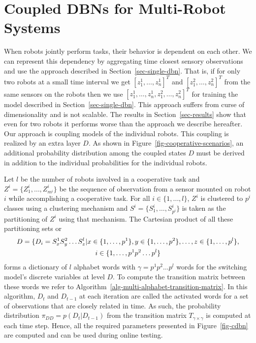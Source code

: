 \documentclass[runningheads]{llncs}
\begin{document}
\section{Coupled DBNs for Multi-Robot Systems}
\label{sec-coupled-dbn}
When robots jointly perform tasks, their behavior is dependent on each other. We can represent this dependency by aggregating time closest sensory observations and use the approach described in Section~\ref{sec-single-dbn}. That is, if for only two robots at a small time interval we get $[z^1_1,\dots,z^1_n]^T$ and $[z^2_1,\dots,z^2_n]^T$ from the same sensors on the robots then we use $[z^1_1,\dots,z^1_n,z^2_1,\dots,z^2_n]^T$ for training the model described in Section~\ref{sec-single-dbn}. This approach suffers from curse of dimensionality and is not scalable. The results in Section~\ref{sec-results} show that even for two robots it performs worse than the approach we describe hereafter. Our approach is coupling models of the individual robots. This coupling is realized by an extra layer $D$. As shown in Figure~\ref{fig-cooperative-scenarios}, an additional probability distribution among the coupled states $D$ must be derived in addition to the individual probabilities for the individual robots.

Let $l$ be the number of robots involved in a cooperative task and $Z^i=\{Z^i_1,\dots,Z^i_{m^{i}}\}$ be the sequence of observation from a sensor mounted on robot $i$ while accomplishing a cooperative task.
For all $i\in\{1,\dots,l\}$, $Z^i$ is clustered to $p^i$ classes using a clustering mechanism and $S^i = \{S^i_1,\dots,S^i_{p^i}\}$ is taken as the partitioning of $Z^i$ using that mechanism. %
The Cartesian product of all these partitioning sets or
    \begin{multline*}
    \small
    D=\{D_i=S^1_xS^2_y\dots S^l_z | x \in \{1,\dots,p^1\}, y \in \{1,\dots,p^2\}, \dots, z \in \{1,\dots,p^l\}, \\
    i \in \{1,\dots,p^1p^2\dots p^l \}\\
    \end{multline*}
    forms a dictionary of $l$ alphabet words with $\gamma= p^1p^2\dots p^l$ words for the switching model's discrete variables at level $D$.  To compute the transition matrix between these words we refer to Algorithm~\ref{alg-multi-alphabet-transition-matrix}. In this algorithm, $D_t$ and $D_{t-1}$ at each iteration are called the activated words for a set of observations that are closely related in time. 
    As such, the probability distribution $\pi_{DD} = p(D_{t}|D_{t-1})$ from the transition matrix $T_{\gamma \times \gamma}$ is computed at each time step. Hence, all the required parameters presented in Figure~\ref{fig-cdbn} are computed and can be used during online testing. 
\end{document}
